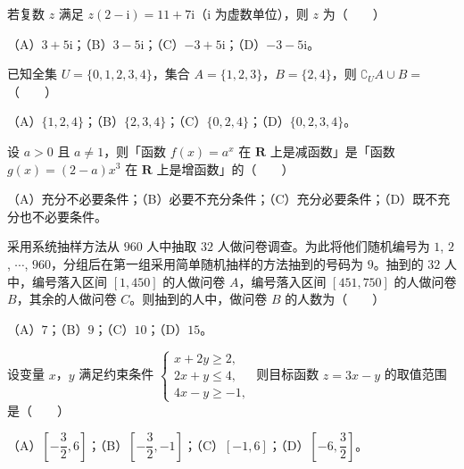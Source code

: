 

\begin{question}
若复数 $z$ 满足 $z(2-\mathrm i)=11+7\mathrm i$（$\mathrm i$ 为虚数单位），则 $z$ 为\mbox{（　　）}

（A）$3+5\mathrm i$；（B）$3-5\mathrm i$；（C）$-3+5\mathrm i$；（D）$-3-5\mathrm i$。

\end{question}
\begin{question}
已知全集 $U=\{0,1,2,3,4\}$，集合 $A=\{1,2,3\}$，$B=\{2,4\}$，则 $\complement_UA\cup B=$\mbox{（　　）}

（A）$\{1,2,4\}$；（B）$\{2,3,4\}$；（C）$\{0,2,4\}$；（D）$\{0,2,3,4\}$。

\end{question}
\begin{question}
设 $a>0$ 且 $a\neq1$，则「函数 $f(x)=a^x$ 在 $\mathbf R$ 上是减函数」是「函数 $g(x)=(2-a)x^3$ 在 $\mathbf R$ 上是增函数」的\mbox{（　　）}

（A）充分不必要条件；（B）必要不充分条件；（C）充分必要条件；（D）既不充分也不必要条件。

\end{question}
\begin{question}
采用系统抽样方法从 $960$ 人中抽取 $32$ 人做问卷调查。为此将他们随机编号为 $1$, $2$, $\cdots$, $960$，分组后在第一组采用简单随机抽样的方法抽到的号码为 $9$。抽到的 $32$ 人中，编号落入区间 $[1,450]$ 的人做问卷 $A$，编号落入区间 $[451,750]$ 的人做问卷 $B$，其余的人做问卷 $C$。则抽到的人中，做问卷 $B$ 的人数为\mbox{（　　）}

（A）$7$；（B）$9$；（C）$10$；（D）$15$。

\end{question}
\begin{question}
设变量 $x$，$y$ 满足约束条件 $\begin{cases}x+2y\geqslant2,\\2x+y\leqslant4,\\4x-y\geqslant-1,\end{cases}$ 则目标函数 $z=3x-y$ 的取值范围是\mbox{（　　）}

（A）$\left[-\dfrac32,6\right]$；（B）$\left[-\dfrac32,-1\right]$；（C）$[-1,6]$；（D）$\left[-6,\dfrac32\right]$。

\Needspace{0.4\textheight}
\end{question}
